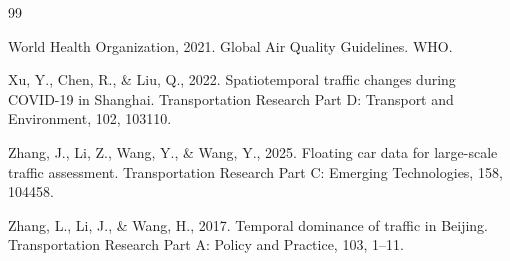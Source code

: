 \documentclass[12pt,a4paper]{article}
\begin{document}
\begin{thebibliography}{99}
\item World Health Organization, 2021. Global Air Quality Guidelines. WHO.

\item Xu, Y., Chen, R., \& Liu, Q., 2022. Spatiotemporal traffic changes during COVID-19 in Shanghai. Transportation Research Part D: Transport and Environment, 102, 103110.

\item Zhang, J., Li, Z., Wang, Y., \& Wang, Y., 2025. Floating car data for large-scale traffic assessment. Transportation Research Part C: Emerging Technologies, 158, 104458.

\item Zhang, L., Li, J., \& Wang, H., 2017. Temporal dominance of traffic in Beijing. Transportation Research Part A: Policy and Practice, 103, 1--11.

\end{thebibliography}
\end{document}

